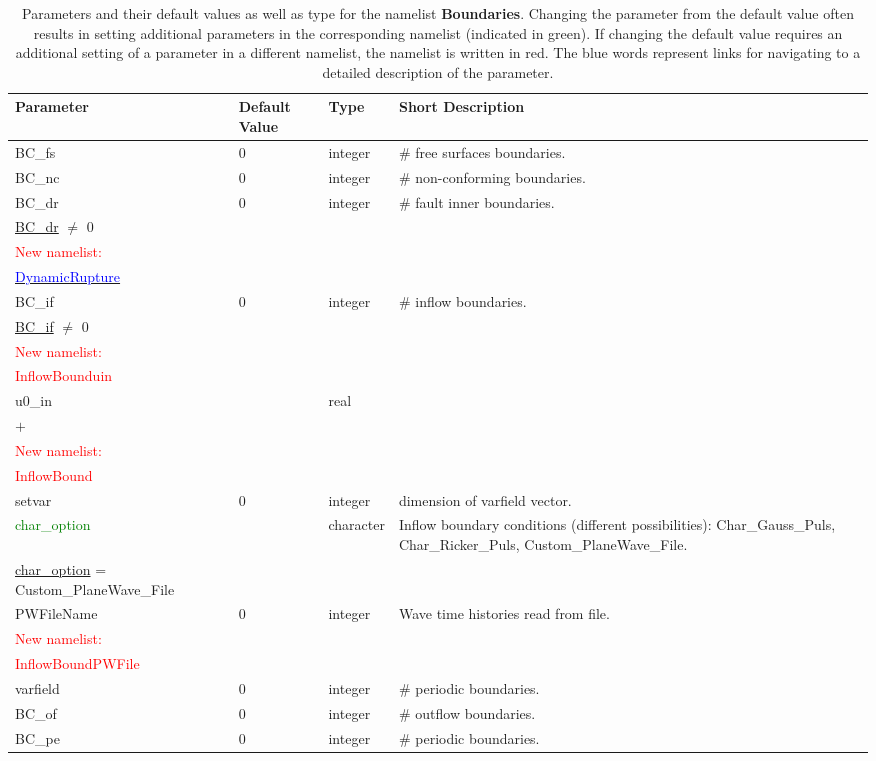 \documentclass[12pt,twoside]{article}
\begin{document}
\newpage

\begin{table}[H]
\caption{Parameters and their default values as well as type for the namelist \textbf{Boundaries}.
         Changing the parameter from the default value often results in setting additional parameters 
         in the corresponding namelist (indicated in green). 
         If changing the default value requires an additional setting of a parameter in a different namelist, 
         the namelist is written in red. The blue words represent 
         links for navigating to a detailed description of the parameter.}
\begin{center}
\begin{tabular}{|p{4.5cm}|p{2.4cm}|p{2cm}|p{4cm}|}
\hline
Parameter & Default Value & Type & Short Description \\
\hline
BC\_fs & 0 & integer & \# free surfaces boundaries.\\
BC\_nc & 0 & integer & \# non-conforming boundaries.\\
BC\_dr & 0 & integer & \# fault inner boundaries.\\
\hdashline
\uline{BC\_dr} $\neq$ 0 & & &\\
\textcolor{red}{New namelist:} & & &\\
\hyperlink{dynrupture}{\textcolor{blue}{DynamicRupture}} & & &\\
\hline
BC\_if & 0 & integer & \# inflow boundaries.\\
\hdashline
\uline{BC\_if} $\neq$ 0 & & &\\
\textcolor{red}{New namelist:} & & &\\
\textcolor{red}{InflowBounduin} & & &\\
u0\_in &  & real & \\
\textbf{$+$} &  & & \\
\textcolor{red}{New namelist:} & & &\\
\textcolor{red}{InflowBound} & & &\\
setvar & 0 & integer & dimension of varfield vector.\\
\textcolor{green}{char\_option} &  & character & Inflow boundary conditions (different possibilities):
                              Char\_Gauss\_Puls, Char\_Ricker\_Puls, Custom\_PlaneWave\_File.\\
\hdashline
\uline{char\_option} = Custom\_PlaneWave\_File & & &\\
PWFileName & 0 & integer & Wave time histories read from file.\\
\textcolor{red}{New namelist:} & & &\\
\textcolor{red}{InflowBoundPWFile} & & &\\
varfield & 0 & integer & \# periodic boundaries.\\
\hline
BC\_of & 0 & integer & \# outflow boundaries.\\
BC\_pe & 0 & integer & \# periodic boundaries.\\
\hline
\end{tabular}
\end{center}
\label{bound-table}
\end{table}
\newpage
\end{document}
